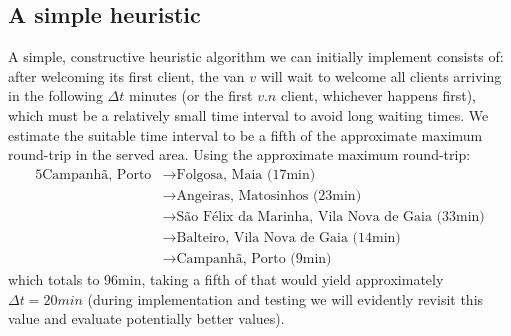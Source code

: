 \subsection{A simple heuristic} \label{algorithm-vrp-heuristic}
A simple, \gls{constructive} heuristic algorithm we can initially implement consists of: after welcoming its first client, the van $v$ will wait to welcome all clients arriving in the following $\Delta t$ minutes (or the first $v.n$ client, whichever happens first), which must be a relatively small time interval to avoid long waiting times. We estimate the suitable time interval to be a fifth of the approximate maximum round-trip in the served area. Using the approximate maximum round-trip:
\begin{alignat*}{5}
    \text{Campanhã, Porto}
    &\rightarrow \text{Folgosa, Maia (17min)} \\
    &\rightarrow\text{Angeiras, Matosinhos (23min)} \\
    &\rightarrow\text{São Félix da Marinha, Vila Nova de Gaia (33min)} \\
    &\rightarrow\text{Balteiro, Vila Nova de Gaia (14min)} \\
    &\rightarrow\text{Campanhã, Porto (9min)}
\end{alignat*}
which totals to 96min, taking a fifth of that would yield approximately $\Delta t = 20min$ (during implementation and testing we will evidently revisit this value and evaluate potentially better values).
